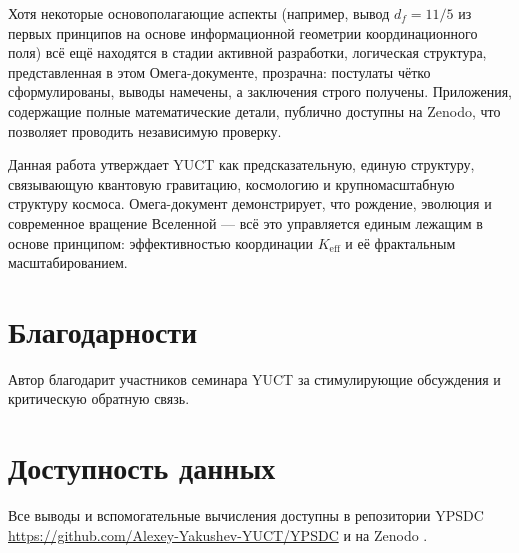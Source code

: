 \documentclass[11pt,a4paper]{article}
\begin{document}
	Хотя некоторые основополагающие аспекты (например, вывод \(d_f = 11/5\) из первых принципов на основе информационной геометрии координационного поля) всё ещё находятся в стадии активной разработки, логическая структура, представленная в этом Омега-документе, прозрачна: постулаты чётко сформулированы, выводы намечены, а заключения строго получены. Приложения, содержащие полные математические детали, публично доступны на Zenodo, что позволяет проводить независимую проверку.
	
	Данная работа утверждает YUCT как предсказательную, единую структуру, связывающую квантовую гравитацию, космологию и крупномасштабную структуру космоса. Омега-документ демонстрирует, что рождение, эволюция и современное вращение Вселенной — всё это управляется единым лежащим в основе принципом: эффективностью координации \(K_{\mathrm{eff}}\) и её фрактальным масштабированием.
	
	
	\section*{Благодарности}
	
	Автор благодарит участников семинара YUCT за стимулирующие обсуждения и критическую обратную связь.
	
	\section*{Доступность данных}
	
	Все выводы и вспомогательные вычисления доступны в репозитории YPSDC \url{https://github.com/Alexey-Yakushev-YUCT/YPSDC} и на Zenodo \cite{AppendixL,AppendixY,AppendixP,AppendixM,AppendixΩ,AppendixB}.
	
\end{document}
